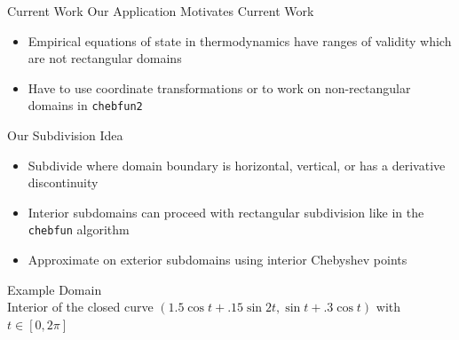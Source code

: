 \documentclass[final]{beamer}
\begin{document}
\begin{frame}{}
\begin{columns}[t]
\begin{column}{.31\linewidth}
\begin{block}{Current Work}
{\color{numhypRed} Our Application Motivates Current Work}
\begin{itemize}
\item Empirical equations of state in thermodynamics have ranges of validity which are not rectangular domains
\item Have to use coordinate transformations \cite{townsend_2013-2} or to work on non-rectangular domains in {\tt chebfun2} 
\end{itemize}
{\color{numhypRed} Our Subdivision Idea}
\begin{itemize}
\item Subdivide where domain boundary is horizontal, vertical, or has a derivative discontinuity
\item Interior subdomains can proceed with rectangular subdivision like in the {\tt chebfun} algorithm
\item Approximate on exterior subdomains using interior Chebyshev points
\end{itemize}

{\color{numhypRed} Example Domain}\\
Interior of the closed curve $(1.5\cos t + .15\sin2t, \sin t + .3\cos t)$ with $t\in[0,2\pi]$

\begin{figure}
\captionsetup[subfigure]{justification=centering,position=bottom}
\begin{minipage}{.5\linewidth}
\vspace*{6mm}
\end{minipage}
\end{figure}
\end{block}
\end{column}
\end{columns}
\end{frame}
\end{document}
